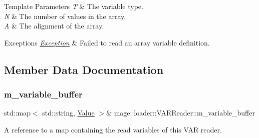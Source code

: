 \begin{DoxyTemplParams}{Template Parameters}
{\em T} & The variable type. \\
\hline
{\em N} & The number of values in the array. \\
\hline
{\em A} & The alignment of the array. \\
\hline
\end{DoxyTemplParams}

\begin{DoxyExceptions}{Exceptions}
{\em \mbox{\hyperlink{classmage_1_1_exception}{Exception}}} & Failed to read an array variable definition. \\
\hline
\end{DoxyExceptions}


\subsection{Member Data Documentation}
\mbox{\label{classmage_1_1loader_1_1_v_a_r_reader_a4553e25a88b1274de12ebc6d078463b5}} 
\subsubsection{\texorpdfstring{m\+\_\+variable\+\_\+buffer}{m\_variable\_buffer}}
{\footnotesize\ttfamily std\+::map$<$ std\+::string, \mbox{\hyperlink{namespacemage_a68ae02d3a746ed2f285aa2b10f131a21}{Value}} $>$\& mage\+::loader\+::\+V\+A\+R\+Reader\+::m\+\_\+variable\+\_\+buffer\hspace{0.3cm}{\ttfamily [private]}}

A reference to a map containing the read variables of this V\+AR reader. 